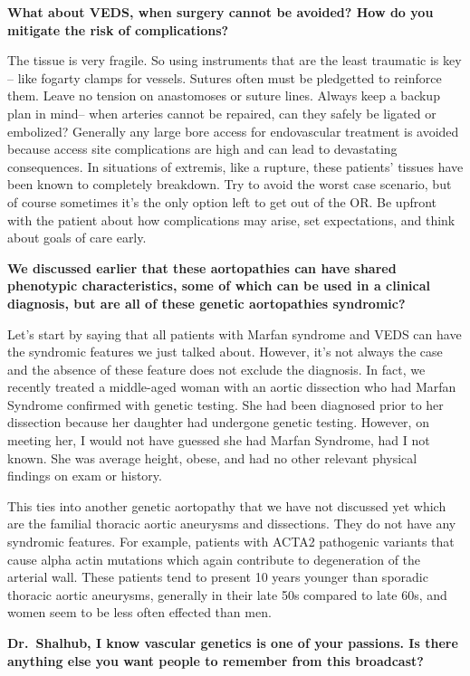 \documentclass[
]{book}
\begin{document}
\textbf{What about VEDS, when surgery cannot be avoided? How do you mitigate
the risk of complications?}

The tissue is very fragile. So using instruments that are the least
traumatic is key -- like fogarty clamps for vessels. Sutures often must
be pledgetted to reinforce them. Leave no tension on anastomoses or
suture lines. Always keep a backup plan in mind-- when arteries cannot
be repaired, can they safely be ligated or embolized? Generally any
large bore access for endovascular treatment is avoided because access
site complications are high and can lead to devastating consequences. In
situations of extremis, like a rupture, these patients' tissues have
been known to completely breakdown. Try to avoid the worst case
scenario, but of course sometimes it's the only option left to get out
of the OR. Be upfront with the patient about how complications may
arise, set expectations, and think about goals of care early.

\textbf{We discussed earlier that these aortopathies can have shared
phenotypic characteristics, some of which can be used in a clinical
diagnosis, but are all of these genetic aortopathies syndromic?}

Let's start by saying that all patients with Marfan syndrome and VEDS
can have the syndromic features we just talked about. However, it's not
always the case and the absence of these feature does not exclude the
diagnosis. In fact, we recently treated a middle-aged woman with an
aortic dissection who had Marfan Syndrome confirmed with genetic
testing. She had been diagnosed prior to her dissection because her
daughter had undergone genetic testing. However, on meeting her, I would
not have guessed she had Marfan Syndrome, had I not known. She was
average height, obese, and had no other relevant physical findings on
exam or history.

This ties into another genetic aortopathy that we have not discussed yet
which are the familial thoracic aortic aneurysms and dissections. They
do not have any syndromic features. For example, patients with ACTA2
pathogenic variants that cause alpha actin mutations which again
contribute to degeneration of the arterial wall. These patients tend to
present 10 years younger than sporadic thoracic aortic aneurysms,
generally in their late 50s compared to late 60s, and women seem to be
less often effected than men.

\textbf{Dr.~Shalhub, I know vascular genetics is one of your passions. Is
there anything else you want people to remember from this broadcast?}
\end{document}

